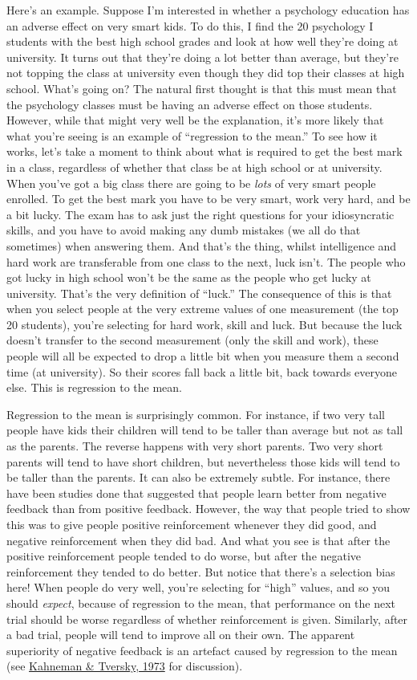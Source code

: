 \documentclass[
]{book}
\begin{document}
Here's an example. Suppose I'm interested in whether a psychology education has an adverse effect on very smart kids. To do this, I find the 20 psychology I students with the best high school grades and look at how well they're doing at university. It turns out that they're doing a lot better than average, but they're not topping the class at university even though they did top their classes at high school. What's going on? The natural first thought is that this must mean that the psychology classes must be having an adverse effect on those students. However, while that might very well be the explanation, it's more likely that what you're seeing is an example of ``regression to the mean.'' To see how it works, let's take a moment to think about what is required to get the best mark in a class, regardless of whether that class be at high school or at university. When you've got a big class there are going to be \emph{lots} of very smart people enrolled. To get the best mark you have to be very smart, work very hard, and be a bit lucky. The exam has to ask just the right questions for your idiosyncratic skills, and you have to avoid making any dumb mistakes (we all do that sometimes) when answering them. And that's the thing, whilst intelligence and hard work are transferable from one class to the next, luck isn't. The people who got lucky in high school won't be the same as the people who get lucky at university. That's the very definition of ``luck.'' The consequence of this is that when you select people at the very extreme values of one measurement (the top 20 students), you're selecting for hard work, skill and luck. But because the luck doesn't transfer to the second measurement (only the skill and work), these people will all be expected to drop a little bit when you measure them a second time (at university). So their scores fall back a little bit, back towards everyone else. This is regression to the mean.

Regression to the mean is surprisingly common. For instance, if two very tall people have kids their children will tend to be taller than average but not as tall as the parents. The reverse happens with very short parents. Two very short parents will tend to have short children, but nevertheless those kids will tend to be taller than the parents. It can also be extremely subtle. For instance, there have been studies done that suggested that people learn better from negative feedback than from positive feedback. However, the way that people tried to show this was to give people positive reinforcement whenever they did good, and negative reinforcement when they did bad. And what you see is that after the positive reinforcement people tended to do worse, but after the negative reinforcement they tended to do better. But notice that there's a selection bias here! When people do very well, you're selecting for ``high'' values, and so you should \emph{expect}, because of regression to the mean, that performance on the next trial should be worse regardless of whether reinforcement is given. Similarly, after a bad trial, people will tend to improve all on their own. The apparent superiority of negative feedback is an artefact caused by regression to the mean (see \protect\hyperlink{ref-Kahneman1973}{Kahneman \& Tversky, 1973} for discussion).
\end{document}
